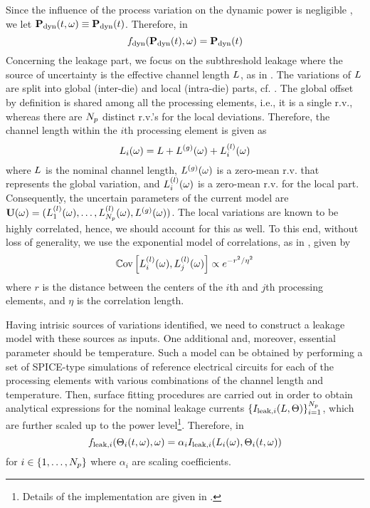 Since the influence of the process variation on the dynamic power is negligible \cite{juan2012, srivastava2010}, we let $\mathbf{P}_{\text{dyn}}(t, \omega) \equiv \mathbf{P}_{\text{dyn}}(t)$. Therefore, in 
\[
  f_{\text{dyn}}(\mathbf{P}_{\text{dyn}}(t), \omega) = \mathbf{P}_{\text{dyn}}(t)
\]
Concerning the leakage part, we focus on the subthreshold leakage where the source of uncertainty is the effective channel length $L$, as in \cite{juan2012}. The variations of $L$ are split into global (inter-die) and local (intra-die) parts, cf. \cite{juan2012, srivastava2010, shen2009}. The global offset by definition is shared among all the processing elements, i.e., it is a single r.v., whereas there are ${N_p}$ distinct r.v.'s for the local deviations. Therefore, the channel length within the $i$th processing element is given as
\[
  L_i(\omega) = L + {L^{(g)}}(\omega) + L^{(l)}_i(\omega)
\]
where $L$ is the nominal channel length, ${L^{(g)}}(\omega)$ is a zero-mean r.v. that represents the global variation, and $L^{(l)}_i(\omega)$ is a zero-mean r.v. for the local part. Consequently, the uncertain parameters of the current model are $\mathbf{U}(\omega) = (L^{(l)}_1(\omega), \dotsc, L^{(l)}_{N_p}(\omega), {L^{(g)}}(\omega) )$. The local variations are known to be highly correlated, hence, we should account for this as well. To this end, without loss of generality, we use the exponential model of correlations, as in \cite{shen2009}, given by
\begin{equation} \elabel{covariance}
  \oCov{\lLeff_i(\o), \lLeff_j(\o)} \propto e^{-r^2/\eta^2}
\end{equation}
where $r$ is the distance between the centers of the $i$th and $j$th processing elements, and $\eta$ is the correlation length.

Having intrisic sources of variations identified, we need to construct a leakage model with these sources as inputs. One additional and, moreover, essential parameter should be temperature. Such a model can be obtained by performing a set of SPICE-type simulations of reference electrical circuits for each of the processing elements with various combinations of the channel length and temperature. Then, surface fitting procedures are carried out in order to obtain analytical expressions for the nominal leakage currents $\{ I_{\text{leak}, i}(L, \Theta) \}_{i = 1}^{N_p}$, which are further scaled up to the power level\footnote{Details of the implementation are given in .}. Therefore, in 
\[
  f_{\text{leak}, i}(\Theta_i(t, \omega), \omega) = \alpha_i I_{\text{leak}, i}(L_i(\omega), \Theta_i(t, \omega))
\]
for $i \in \{ 1, \dotsc, {N_p} \}$ where $\alpha_i$ are scaling coefficients.
